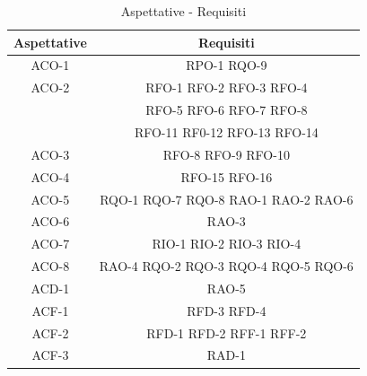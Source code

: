 
\begin{table}[h]
\begin{center}
     \begin{tabular}
           {@{\extracolsep{\fill}}|c|c|}
     \hline
      \textbf{Aspettative} & \textbf{Requisiti} \\
      \hline
     ACO-1 & RPO-1 RQO-9 \\
     \hline
     ACO-2 & RFO-1 RFO-2 RFO-3 RFO-4\\ & RFO-5 RFO-6 RFO-7 RFO-8\\ & RFO-11 RF0-12 RFO-13 RFO-14 \\
     \hline
     ACO-3 & RFO-8 RFO-9 RFO-10 \\
     \hline
     ACO-4 & RFO-15 RFO-16 \\
     \hline
     ACO-5 & RQO-1 RQO-7 RQO-8 RAO-1 RAO-2 RAO-6 \\
     \hline
     ACO-6 & RAO-3 \\
     \hline
     ACO-7 & RIO-1 RIO-2 RIO-3 RIO-4 \\
     \hline
     ACO-8 & RAO-4 RQO-2 RQO-3 RQO-4 RQO-5 RQO-6 \\
     \hline
     ACD-1 & RAO-5 \\
     \hline
     ACF-1 & RFD-3 RFD-4 \\
     \hline
     ACF-2 & RFD-1 RFD-2 RFF-1 RFF-2 \\
     \hline
     ACF-3 & RAD-1 \\
    \hline %
    \end{tabular}
  \caption{Aspettative - Requisiti} %
  \label{tab:aspettative}
  \end{center}
\end{table}
 \newpage
 

